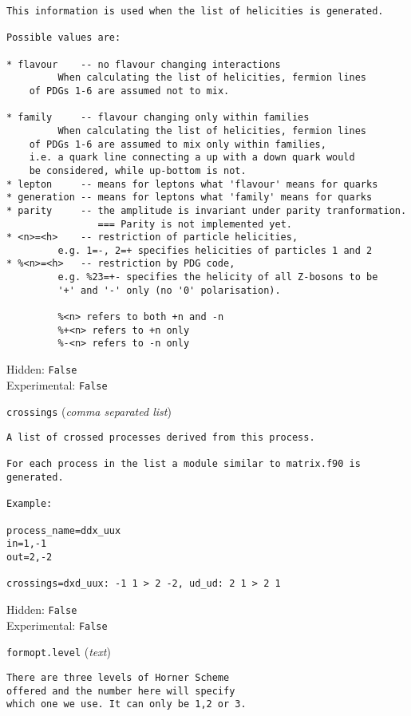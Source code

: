 \begin{basedescript}{\desclabelstyle{\pushlabel}}
\begin{verbatim}
This information is used when the list of helicities is generated.

Possible values are:

* flavour    -- no flavour changing interactions
         When calculating the list of helicities, fermion lines
    of PDGs 1-6 are assumed not to mix.

* family     -- flavour changing only within families
         When calculating the list of helicities, fermion lines
    of PDGs 1-6 are assumed to mix only within families,
    i.e. a quark line connecting a up with a down quark would
    be considered, while up-bottom is not.
* lepton     -- means for leptons what 'flavour' means for quarks
* generation -- means for leptons what 'family' means for quarks
* parity     -- the amplitude is invariant under parity tranformation.
                === Parity is not implemented yet.
* <n>=<h>    -- restriction of particle helicities,
         e.g. 1=-, 2=+ specifies helicities of particles 1 and 2
* %<n>=<h>   -- restriction by PDG code,
         e.g. %23=+- specifies the helicity of all Z-bosons to be
         '+' and '-' only (no '0' polarisation).

         %<n> refers to both +n and -n
         %+<n> refers to +n only
         %-<n> refers to -n only
\end{verbatim}
Hidden: \verb|False|
\\Experimental: \verb|False|
\\\item[\colorbox{gray!30}{\texttt{crossings}}] (\textit{comma separated list})
\begin{verbatim}
A list of crossed processes derived from this process.

For each process in the list a module similar to matrix.f90 is
generated.

Example:

process_name=ddx_uux
in=1,-1
out=2,-2

crossings=dxd_uux: -1 1 > 2 -2, ud_ud: 2 1 > 2 1
\end{verbatim}
Hidden: \verb|False|
\\Experimental: \verb|False|
\\\item[\colorbox{gray!30}{\texttt{formopt.level}}] (\textit{text})
\begin{verbatim}
There are three levels of Horner Scheme
offered and the number here will specify
which one we use. It can only be 1,2 or 3.


\end{verbatim}
\end{basedescript}
